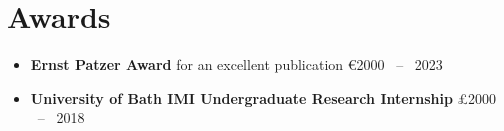 \section*{Awards}

\begin{itemize}
    \item \textbf{Ernst Patzer Award} for an excellent publication \hfill \euro{}2000 ~--~ 2023
    \item \textbf{University of Bath IMI Undergraduate Research Internship} \hfill £2000 ~--~ 2018
\end{itemize}